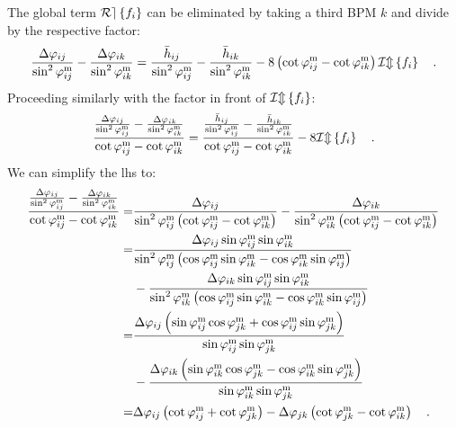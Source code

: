 The global term $\mathcal{Re} \left\{ f_i \right\}$ can be eliminated by taking a third BPM $k$ and divide by the respective factor:
%
\begin{equation}
	\frac{\Delta\varphi_{ij}}{\sin^2\varphi_{ij}^\text{m}} - \frac{\Delta\varphi_{ik}}{\sin ^2\varphi_{ik}^\text{m}}
  =
	\frac{
    \bar{h}_{ij}
  }{
    \sin^2\varphi_{ij}^\text{m}
  } -
  \frac{
    \bar{h}_{ik }
  }{
    \sin^2\varphi_{ik}^\text{m}
  }
  - 8\left(\cot\varphi_{ij}^\text{m} - \cot\varphi_{ik}^\text{m}\right)\mathcal{Im} \left\{ f_i \right\}
    \quad .
    \label{eq_Deltaphi_first_step}
\end{equation}
%
Proceeding similarly with the factor in front of $\mathcal{Im} \left\{ f_i \right\}$:
%
\begin{equation}
  \frac{
    \frac{\Delta\varphi_{ij}}{\sin^2\varphi_{ij}^\text{m}} - \frac{\Delta\varphi_{ik}}{\sin ^2\varphi_{ik}^\text{m}}
  }{
    \cot\varphi_{ij}^\text{m} - \cot\varphi_{ik}^\text{m} } =
  \frac{
    \frac{ \bar{h}_{ij} }{ \sin^2\varphi_{ij}^\text{m} } -
    \frac{ \bar{h}_{ik } }{ \sin^2\varphi_{ik}^\text{m} }
  }{
    \cot\varphi_{ij}^\text{m} - \cot\varphi_{ik}^\text{m}
  }
  - 8\mathcal{Im} \left\{ f_i \right\}
    \quad .
    \label{eq_Deltaphi_second_step}
\end{equation}
%
We can simplify the lhs to:
{
\small
%
\begin{align}
  \frac{
    \frac{\Delta\varphi_{ij}}{\sin^2\varphi_{ij}^\text{m}} - \frac{\Delta\varphi_{ik}}{\sin ^2\varphi_{ik}^\text{m}}
  }{
  \cot\varphi_{ij}^\text{m} - \cot\varphi_{ik}^\text{m} }
  =&  \frac{\Delta\varphi_{ij}}{
    \sin^2\varphi_{ij}^\text{m} \left( \cot\varphi_{ij}^\text{m} - \cot\varphi_{ik}^\text{m} \right)
  }
  -
  \frac{\Delta\varphi_{ik}}{
    \sin^2\varphi_{ik}^\text{m} \left( \cot\varphi_{ij}^\text{m} - \cot\varphi_{ik}^\text{m} \right)
  } \notag \\
  =&
  \frac{
    \Delta\varphi_{ij}\sin\varphi_{ij}^\text{m} \sin\varphi_{ik}^\text{m}
  }{
    \sin^2\varphi_{ij}^\text{m} \left( \cos\varphi_{ij}^\text{m} \sin\varphi_{ik}^\text{m} - \cos\varphi_{ik}^\text{m}\sin\varphi_{ij}^\text{m} \right)
  }\notag \\
  &-
  \frac{
    \Delta\varphi_{ik}\sin\varphi_{ij}^\text{m} \sin\varphi_{ik}^\text{m}
  }{
    \sin^2\varphi_{ik}^\text{m} \left( \cos\varphi_{ij}^\text{m} \sin\varphi_{ik}^\text{m} - \cos\varphi_{ik}^\text{m}\sin\varphi_{ij}^\text{m} \right)
  } \notag  \\
  =& 
  \frac{
    \Delta\varphi_{ij}\left( 
    \sin \varphi_{ij}^\text{m} \cos \varphi_{jk}^\text{m} + \cos \varphi_{ij}^\text{m} \sin\varphi_{jk}^\text{m}\right)
  }{
    \sin\varphi_{ij}^\text{m} \sin \varphi_{jk}^\text{m}
  } \notag \\
  &-
  \frac{
    \Delta\varphi_{ik}\left( 
    \sin \varphi_{ik}^\text{m} \cos \varphi_{jk}^\text{m} - \cos \varphi_{ik}^\text{m} \sin\varphi_{jk}^\text{m}\right)
  }{
    \sin\varphi_{ik}^\text{m} \sin \varphi_{jk}^\text{m}
  } \notag \\
  =&
  \Delta\varphi_{ij} \left( 
    \cot \varphi_{ij}^\text{m} + \cot\varphi_{jk}^\text{m}
  \right)
  -
  \Delta\varphi_{jk} \left( 
    \cot\varphi_{jk}^\text{m} - \cot\varphi_{ik}^\text{m}
  \right)
  \quad .
\end{align}
%
}
